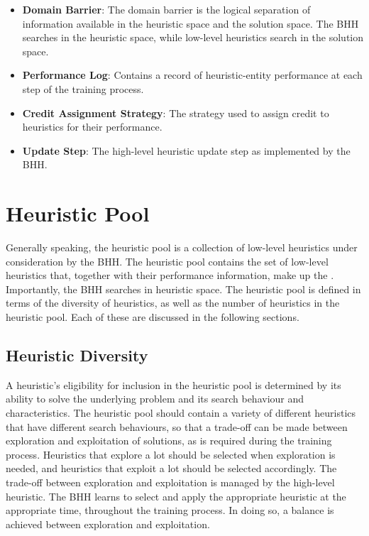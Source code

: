 \begin{itemize}
      \item \textbf{Domain Barrier}: The domain barrier is the logical separation of information available in the heuristic space and the solution space. The \acs{BHH} searches in the heuristic space, while low-level heuristics search in the solution space.

      \item \textbf{Performance Log}: Contains a record of heuristic-entity performance at each step of the training process.

      \item \textbf{Credit Assignment Strategy}: The strategy used to assign credit to heuristics for their performance.

      \item \textbf{Update Step}: The high-level heuristic update step as implemented by the \acs{BHH}.
\end{itemize}

\section{Heuristic Pool}\label{sec:bhh:heuristic_pool}

Generally speaking, the heuristic pool is a collection of low-level heuristics under consideration by the \acs{BHH}. The heuristic pool contains the set of low-level heuristics that, together with their performance information, make up the . Importantly, the \acs{BHH} searches in heuristic space. The heuristic pool is defined in terms of the diversity of heuristics, as well as the number of heuristics in the heuristic pool. Each of these are discussed in the following sections.

\subsection{Heuristic Diversity}\label{sec:bhh:heuristic_pool:diversity}

A heuristic's eligibility for inclusion in the heuristic pool is determined by its ability to solve the underlying problem and its search behaviour and characteristics. The heuristic pool should contain a variety of different heuristics that have different search behaviours, so that a trade-off can be made between exploration and exploitation of solutions, as is required during the training process. Heuristics that explore a lot should be selected when exploration is needed, and heuristics that exploit a lot should be selected accordingly. The trade-off between exploration and exploitation is managed by the high-level heuristic. The \acs{BHH} learns to select and apply the appropriate heuristic at the appropriate time, throughout the training process. In doing so, a balance is achieved between exploration and exploitation.

